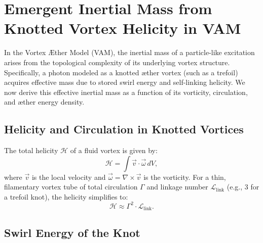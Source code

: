 \documentclass[12pt]{article}
\begin{document}
  \section{Emergent Inertial Mass from Knotted Vortex Helicity in VAM}

  In the Vortex \AE{}ther Model (VAM), the inertial mass of a particle-like excitation arises from the topological complexity of its underlying vortex structure. Specifically, a photon modeled as a knotted \ae{}ther vortex (such as a trefoil) acquires effective mass due to stored swirl energy and self-linking helicity. We now derive this effective inertial mass as a function of its vorticity, circulation, and \ae{}ther energy density.

  \subsection*{Helicity and Circulation in Knotted Vortices}

  The total helicity $\mathcal{H}$ of a fluid vortex is given by:
  \begin{equation}
    \mathcal{H} = \int \vec{v} \cdot \vec{\omega} \, dV,
  \end{equation}
  where $\vec{v}$ is the local velocity and $\vec{\omega} = \nabla \times \vec{v}$ is the vorticity. For a thin, filamentary vortex tube of total circulation $\Gamma$ and linkage number $\mathcal{L}_\text{link}$ (e.g., 3 for a trefoil knot), the helicity simplifies to:
  \begin{equation}
    \mathcal{H} \approx \Gamma^2 \cdot \mathcal{L}_\text{link}.
  \end{equation}

  \subsection{Swirl Energy of the Knot}
\end{document}
